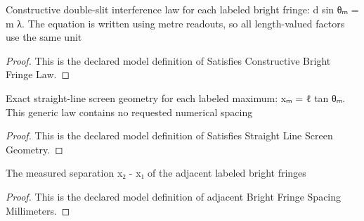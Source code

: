 \begin{definition}
  \label{def:physics:phyx-mini-0125:phyxminiproblems-problemphyxmini0125-satisfiesconstructivebrightfringelaw}
  Constructive double-slit interference law for each labeled bright fringe: d sin θₘ = m λ. The equation is written using metre readouts, so all length-valued factors use the same unit
\end{definition}
\begin{proof}
  This is the declared model definition of Satisfies Constructive Bright Fringe Law.
\end{proof}
\begin{definition}
  \label{def:physics:phyx-mini-0125:phyxminiproblems-problemphyxmini0125-satisfiesstraightlinescreengeometry}
  Exact straight-line screen geometry for each labeled maximum: xₘ = ℓ tan θₘ. This generic law contains no requested numerical spacing
\end{definition}
\begin{proof}
  This is the declared model definition of Satisfies Straight Line Screen Geometry.
\end{proof}
\begin{definition}
  \label{def:physics:phyx-mini-0125:phyxminiproblems-problemphyxmini0125-adjacentbrightfringespacingmillimeters}
  The measured separation x₂ - x₁ of the adjacent labeled bright fringes
\end{definition}
\begin{proof}
  This is the declared model definition of adjacent Bright Fringe Spacing Millimeters.
\end{proof}
